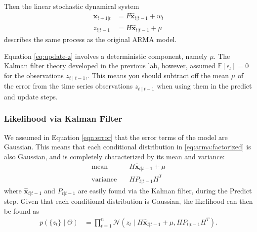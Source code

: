 Then the linear stochastic
dynamical system
\begin{align}
    \hat{\textbf{x}}_{t+1|t} &= F\hat{\textbf{x}}_{t|t-1} + w_t\\
    z_{t|t-1} &= H\hat{\textbf{x}}_{t|t-1} + \mu
    \label{eq:update-z}
\end{align}
describes the same process as the original $\text{ARMA}$ model.

\begin{info}
Equation \ref{eq:update-z} involves a deterministic component, namely $\mu$.
The Kalman filter theory developed in the previous lab, however, assumed $\mathbb{E}[\epsilon_t]=0$ for the observations $z_{t\mid t-1}$,.
This means you should subtract off the mean
$\mu$ of the error from the time series observations $z_{t\mid t-1}$ when using them in the predict and update
steps.
\end{info}

\subsubsection*{Likelihood via Kalman Filter}

We assumed in Equation \ref{eqn:error} that the error terms of the model are Gaussian.
This means that each conditional distribution in \ref{eq:arma:factorized} is also Gaussian, and is completely characterized by its mean and variance:
\begin{align}
    \label{eq:mean:variance1}
    \text{mean} & \quad H\hat{\textbf{x}}_{t|t-1} + \mu \\
    \label{eq:mean:variance2}
    \text{variance} & \quad HP_{t|t-1}H^T
\end{align}
where $\hat{\textbf{x}}_{t|t-1}$ and $P_{t|t-1}$ are easily found via the Kalman filter, during the Predict step.
Given that each conditional distribution is Gaussian, the likelihood can then be found as
\begin{align}
    \label{eq:arma:likelihood}
    p(\{z_t\} \mid \Theta)& = \prod_{t=1}^{n} \mathscr{N}(z_t\mid H\hat{\textbf{x}}_{t|t-1} + \mu, HP_{t|t-1}H^T).
\end{align}

